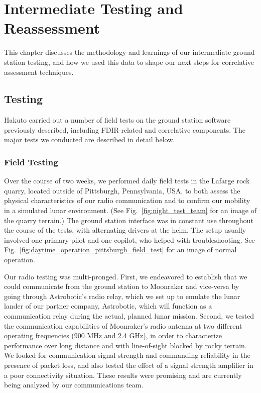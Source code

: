 \chapter{Intermediate Testing and Reassessment}

This chapter discusses the methodology and learnings of our intermediate ground station testing, and how we used this data to shape our next steps for correlative assessment techniques.

\section{Testing}

Hakuto carried out a number of field tests on the ground station software previously described, including FDIR-related and correlative components. The major tests we conducted are described in detail below.

\subsection{Field Testing}

Over the course of two weeks, we performed daily field tests in the Lafarge rock quarry, located outside of Pittsburgh, Pennsylvania, USA, to both assess the physical characteristics of our radio communication and to confirm our mobility in a simulated lunar environment. (See Fig.~\ref{fig:night_test_team} for an image of the quarry terrain.) The ground station interface was in constant use throughout the course of the tests, with alternating drivers at the helm. The setup usually involved one primary pilot and one copilot, who helped with troubleshooting. See Fig.~\ref{fig:daytime_operation_pittsburgh_field_test} for an image of normal operation.

Our radio testing was multi-pronged. First, we endeavored to establish that we could communicate from the ground station to Moonraker and vice-versa by going through Astrobotic's radio relay, which we set up to emulate the lunar lander of our partner company, Astrobotic, which will function as a communication relay during the actual, planned lunar mission. Second, we tested the communication capabilities of Moonraker's radio antenna at two different operating frequencies (900 MHz and 2.4 GHz), in order to characterize performance over long distance and with line-of-sight blocked by rocky terrain. We looked for communication signal strength and commanding reliability in the presence of packet loss, and also tested the effect of a signal strength amplifier in a poor connectivity situation. These results were promising and are currently being analyzed by our communications team.

